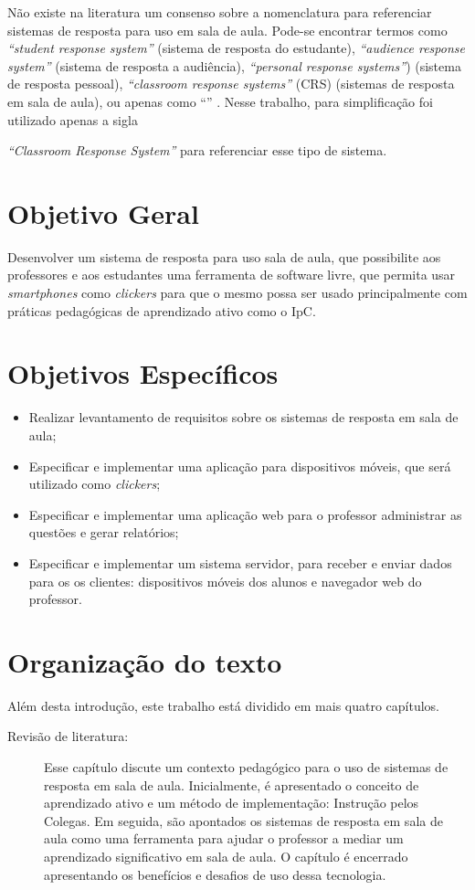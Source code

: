Não existe na literatura um consenso sobre a nomenclatura para referenciar sistemas de
resposta para uso em sala de aula. Pode-se encontrar termos como
{\textit{``student response system''}} (sistema de resposta do estudante),
{\textit{``audience response system''}} (sistema de resposta a audiência),
{\textit{``personal response systems''})} (sistema de resposta pessoal),
{\textit{``classroom response systems''} (CRS)} (sistemas de resposta em sala de aula),
ou apenas como {``\clickers''} \cite{Hunsu2016}.
Nesse trabalho, para simplificação foi utilizado apenas a sigla {\clickers} {\textit{``Classroom Response System''}
para referenciar esse tipo de sistema.

\section{Objetivo Geral}
Desenvolver um sistema de resposta para uso sala de aula,
que possibilite aos professores e aos estudantes uma ferramenta de software livre,
que permita usar {\textit{smartphones}} como \textit{clickers} para que o mesmo possa
ser usado principalmente com práticas pedagógicas de aprendizado ativo como o IpC.

\section{Objetivos Específicos}

\begin{itemize}
    \item Realizar levantamento de requisitos sobre os sistemas de resposta em sala de aula;
    \item Especificar e implementar uma aplicação para dispositivos móveis, que será utilizado como \textit{clickers};
    \item Especificar e implementar uma aplicação web para o professor administrar as questões e gerar relatórios;
    \item Especificar e implementar um sistema servidor, para receber e
    enviar dados para os os clientes: dispositivos móveis dos alunos e navegador
    web do professor.
\end{itemize}

\section{Organização do texto}
Além desta introdução, este trabalho está dividido em mais quatro capítulos.

\begin{description}
  \item[Revisão de literatura:] Esse capítulo discute um contexto pedagógico
  para o uso de sistemas de resposta em sala de aula. Inicialmente, é
  apresentado o conceito de aprendizado ativo e um método de implementação: Instrução pelos Colegas.
  Em seguida, são apontados os sistemas de resposta em sala de aula como uma
  ferramenta para ajudar o professor a mediar um aprendizado significativo  em
  sala de aula. O capítulo é encerrado apresentando os benefícios e desafios de uso dessa tecnologia.


\end{description}}
